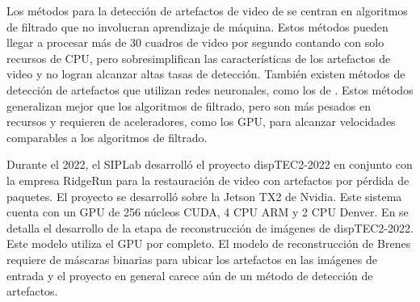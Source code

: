 Los métodos para la detección de artefactos de video de \cite{Vranjes2018, Glavota2018} se centran en algoritmos de filtrado que no involucran aprendizaje de máquina. Estos métodos pueden llegar a procesar más de 30 cuadros de video por segundo contando con solo recursos de CPU, pero sobresimplifican las características de los artefactos de video y no logran alcanzar altas tasas de detección. También existen métodos de detección de artefactos que utilizan redes neuronales, como los de \cite{Goodall2019, Rajasekar2020}. Estos métodos generalizan mejor que los algoritmos de filtrado, pero son más pesados en recursos y requieren de aceleradores, como los GPU, para alcanzar velocidades comparables a los algoritmos de filtrado.

Durante el 2022, el SIPLab desarrolló el proyecto dispTEC2-2022 en conjunto con la empresa RidgeRun para la restauración de video con artefactos por pérdida de paquetes. El proyecto se desarrolló sobre la Jetson TX2 de Nvidia. Este sistema cuenta con un GPU de 256 núcleos CUDA, 4 CPU ARM y 2 CPU Denver. En \cite{Brenes2022} se detalla el desarrollo de la etapa de reconstrucción de imágenes de dispTEC2-2022. Este modelo utiliza el GPU por completo. El modelo de reconstrucción de Brenes requiere de máscaras binarias para ubicar los artefactos en las imágenes de entrada y el proyecto en general carece aún de un método de detección de artefactos.
